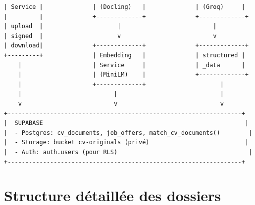 \documentclass[11pt,a4paper]{report}
\begin{document}
\begin{lstlisting}[caption={Architecture système (vue globale)}, language=text]
| Service |              | (Docling)   |              | (Groq)     |
|         |              +-------------+              +-------------+
| upload  |                     |                          |
| signed  |                     v                          v
| download|              +-------------+              +-------------+
+---------+              | Embedding   |              | structured |
    |                    | Service     |              | _data      |
    |                    | (MiniLM)    |              +-------------+
    |                    +-------------+                     |
    |                          |                             |
    v                          v                             v
+------------------------------------------------------------------+
|  SUPABASE                                                         |
|  - Postgres: cv_documents, job_offers, match_cv_documents()        |
|  - Storage: bucket cv-originals (privé)                           |
|  - Auth: auth.users (pour RLS)                                     |
+------------------------------------------------------------------+
\end{lstlisting}

\section{Structure détaillée des dossiers}
\end{document}
